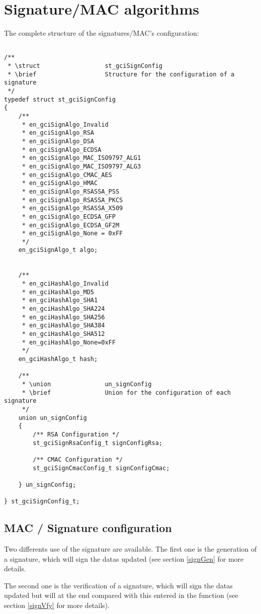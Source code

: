 \chapter{Signature/MAC algorithms}
\label{signature}

The complete structure of the signatures/MAC's configuration:
\begin{lstlisting}

/**
 * \struct 					st_gciSignConfig
 * \brief					Structure for the configuration of a signature
 */
typedef struct st_gciSignConfig
{
	/**
	 * en_gciSignAlgo_Invalid
	 * en_gciSignAlgo_RSA
	 * en_gciSignAlgo_DSA
	 * en_gciSignAlgo_ECDSA
	 * en_gciSignAlgo_MAC_ISO9797_ALG1
	 * en_gciSignAlgo_MAC_ISO9797_ALG3
	 * en_gciSignAlgo_CMAC_AES
	 * en_gciSignAlgo_HMAC
	 * en_gciSignAlgo_RSASSA_PSS
	 * en_gciSignAlgo_RSASSA_PKCS
	 * en_gciSignAlgo_RSASSA_X509
	 * en_gciSignAlgo_ECDSA_GFP
	 * en_gciSignAlgo_ECDSA_GF2M
	 * en_gciSignAlgo_None = 0xFF
	 */
	en_gciSignAlgo_t algo;


	/**
	 * en_gciHashAlgo_Invalid
	 * en_gciHashAlgo_MD5
	 * en_gciHashAlgo_SHA1
	 * en_gciHashAlgo_SHA224
	 * en_gciHashAlgo_SHA256
	 * en_gciHashAlgo_SHA384
	 * en_gciHashAlgo_SHA512
	 * en_gciHashAlgo_None=0xFF
	 */
	en_gciHashAlgo_t hash;

	/**
	 * \union 				un_signConfig
	 * \brief				Union for the configuration of each signature
	 */
	union un_signConfig
	{
		/** RSA Configuration */
		st_gciSignRsaConfig_t signConfigRsa;

		/** CMAC Configuration */
		st_gciSignCmacConfig_t signConfigCmac;
		
	} un_signConfig;
	
} st_gciSignConfig_t;

\end{lstlisting}




\section{MAC / Signature configuration}
Two differents use of the signature are available.\newline
The first one is the generation of a signature, which will sign the datas
updated (see
section \ref{signGen} for more details.

The second one is the verification of a signature, which will sign the datas
updated but will at the end compared with this entered in the function (see
section \ref{signVfy} for more details).

